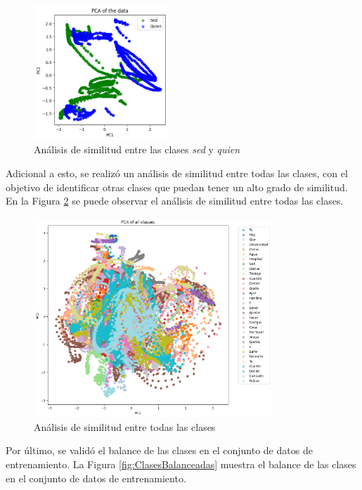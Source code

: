\begin{figure}[H]
    \centering
    \includegraphics[width=0.45\textwidth]{figuras/PCA-SedQuien.png}
    \caption{Análisis de similitud entre las clases \textit{sed} y \textit{quien}}
    \label{fig:PCA-SedQuien}
\end{figure}

Adicional a esto, se realizó un análisis de similitud entre todas las clases, con el objetivo de identificar otras clases que puedan tener un alto grado de similitud.
En la Figura \ref{fig:PCA-AllClasses} se puede observar el análisis de similitud entre todas las clases.

\begin{figure}[H]
    \centering
    \includegraphics[width=0.8\textwidth]{figuras/PCA-All.png}
    \caption{Análisis de similitud entre todas las clases}
    \label{fig:PCA-AllClasses}
\end{figure}

Por último, se validó el balance de las clases en el conjunto de datos de entrenamiento.
La Figura \ref{fig:ClasesBalanceadas} muestra el balance de las clases en el conjunto de datos de entrenamiento.

